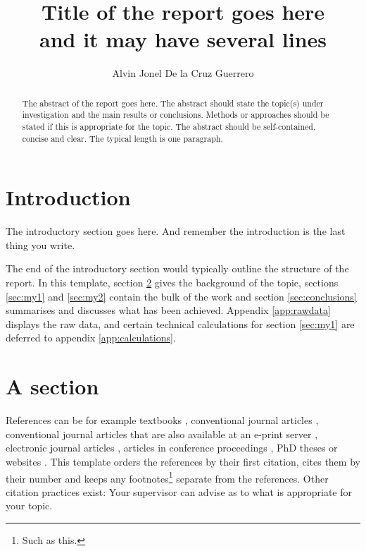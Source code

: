 \documentclass{uonmathreport}
\title{Title of the report goes here\\ and it may have several lines}
\author{Alvin Jonel De la Cruz Guerrero}
\begin{document}
\maketitle

\begin{abstract}
The abstract of the report goes here. The abstract should state the
topic(s) under investigation and the main results or
conclusions. Methods or approaches should be stated if this is
appropriate for the topic. The abstract should be self-contained,
concise and clear. The typical length is one paragraph.
\end{abstract}

\setcounter{tocdepth}{2}  %
\tableofcontents 
\newpage

\section{Introduction} \label{sec:intro}

The introductory section goes here. And remember the introduction
is the last thing you write.


The end of the introductory section would typically outline the
structure of the report. In this template, section \ref{sec:background}
gives the background of the topic, sections \ref{sec:my1} and
\ref{sec:my2} contain the bulk of the work and section
\ref{sec:conclusions} summarises and discusses what has been
achieved. Appendix \ref{app:rawdata} displays the raw data, and
certain technical calculations for section \ref{sec:my1} are deferred
to appendix \ref{app:calculations}.

\section{A section} \label{sec:background}

References can be for example
textbooks \cite{bott-tu,haw-ell,wolf,alling-greenleaf,hatcher},
conventional journal articles \cite{wheeler-geon,dewitt-can},
conventional journal articles that are also available at an e-print
server \cite{krasnov-louko,barrett-dawe}, electronic journal
articles \cite{poisson-livrev}, articles in conference proceedings
\cite{poisson-gr17}, PhD theses \cite{giulini-thesis,langlois-thesis}
or websites \cite{ligo-site}. This template orders the references by
their first citation, cites them by their number and keeps any
footnotes\footnote{Such as this.} separate from the references. Other
citation practices exist: Your supervisor can advise as to what is
appropriate for your topic.
\end{document}
